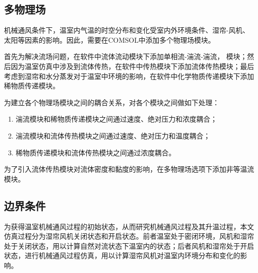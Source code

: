 	\subsection{多物理场}
	机械通风条件下，温室内气温的时空分布和变化受室内外环境条件、湿帘-风机、太阳等因素的影响。因此，需要在COMSOL中添加多个物理场模块。
	
首先为解决流场问题，在软件中流体流动模块下添加单相流-湍流-湍流， 模块；然后因为温室仿真中涉及到流体传热，在软件中传热模块下添加流体传热模块；最后考虑到湿帘和水分蒸发对于温室中环境的影响，在软件中化学物质传递模块下添加稀物质传递模块。

为建立各个物理场模块之间的耦合关系，对各个模块之间做如下处理：
	\begin{enumerate}
		\item 湍流模块和稀物质传递模块之间通过速度、绝对压力和浓度耦合；
		\item 湍流模块和流体传热模块之间通过速度、绝对压力和温度耦合；
		\item 稀物质传递模块和流体传热模块之间通过浓度耦合。
	\end{enumerate}
为了引入流体传热模块对流体密度和黏度的影响，在多物理场选项下添加非等温流模块。

	\subsection{边界条件}
	为获得温室机械通风过程的初始状态，从而研究机械通风过程及其升温过程，本文仿真过程分为湿帘风机关闭状态和开启状态。前者温室处于密闭环境，风机和湿帘处于关闭状态，用以计算自然对流状态下温室内的状态；后者风机和湿帘处于开启状态，进行机械通风过程仿真，用以计算湿帘风机对温室内环境分布和变化的影响。


